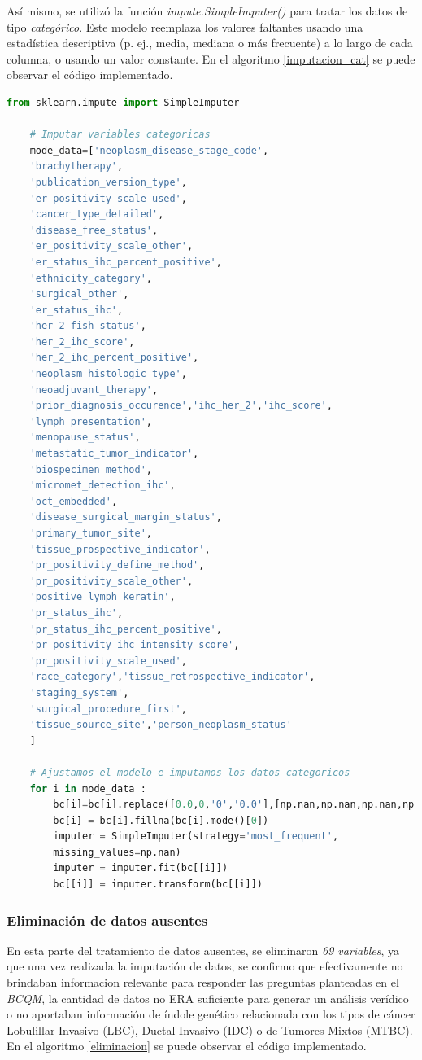  Así mismo, se utilizó la función \textit{impute.SimpleImputer()} para tratar los datos de tipo \textit{categórico}. Este modelo reemplaza los valores faltantes usando una estadística descriptiva (p. ej., media, mediana o más frecuente) a lo largo de cada columna, o usando un valor constante. En el algoritmo \ref{imputacion_cat} se puede observar el código implementado.
  
   \begin{lstlisting}[basicstyle=\scriptsize,language=Python, label=imputacion_cat, caption=Imputar datos categóricos con sklearn en Python.]
  	from sklearn.impute import SimpleImputer
  	
	# Imputar variables categoricas
	mode_data=['neoplasm_disease_stage_code',
	'brachytherapy',
	'publication_version_type',
	'er_positivity_scale_used',
	'cancer_type_detailed',
	'disease_free_status',
	'er_positivity_scale_other',
	'er_status_ihc_percent_positive',
	'ethnicity_category',
	'surgical_other',
	'er_status_ihc',
	'her_2_fish_status',
	'her_2_ihc_score',
	'her_2_ihc_percent_positive',
	'neoplasm_histologic_type',
	'neoadjuvant_therapy',
	'prior_diagnosis_occurence','ihc_her_2','ihc_score',
	'lymph_presentation',
	'menopause_status',
	'metastatic_tumor_indicator',
	'biospecimen_method',
	'micromet_detection_ihc',
	'oct_embedded',
	'disease_surgical_margin_status',
	'primary_tumor_site',
	'tissue_prospective_indicator',
	'pr_positivity_define_method',
	'pr_positivity_scale_other',
	'positive_lymph_keratin',
	'pr_status_ihc',
	'pr_status_ihc_percent_positive',
	'pr_positivity_ihc_intensity_score',
	'pr_positivity_scale_used',
	'race_category','tissue_retrospective_indicator',
	'staging_system',
	'surgical_procedure_first',
	'tissue_source_site','person_neoplasm_status'
	]
  		
  	# Ajustamos el modelo e imputamos los datos categoricos
  	for i in mode_data :
	  	bc[i]=bc[i].replace([0.0,0,'0','0.0'],[np.nan,np.nan,np.nan,np.nan])
	  	bc[i] = bc[i].fillna(bc[i].mode()[0])
	  	imputer = SimpleImputer(strategy='most_frequent', 
	  	missing_values=np.nan)
	  	imputer = imputer.fit(bc[[i]])
	  	bc[[i]] = imputer.transform(bc[[i]])
  \end{lstlisting}
 
 
\subsubsection{Eliminación de datos ausentes}

En esta parte del tratamiento de datos ausentes, se eliminaron \textit{69 variables}, ya que una vez realizada la imputación de datos, se confirmo que efectivamente no brindaban informacion relevante para responder las preguntas planteadas en el \textit{BCQM}, la cantidad de datos no ERA suficiente para generar un análisis verídico o  no aportaban información de índole genético relacionada con los tipos de cáncer Lobulillar Invasivo (LBC), Ductal Invasivo (IDC) o de Tumores Mixtos (MTBC). En el algoritmo \ref{eliminacion} se puede observar el código implementado.
 
